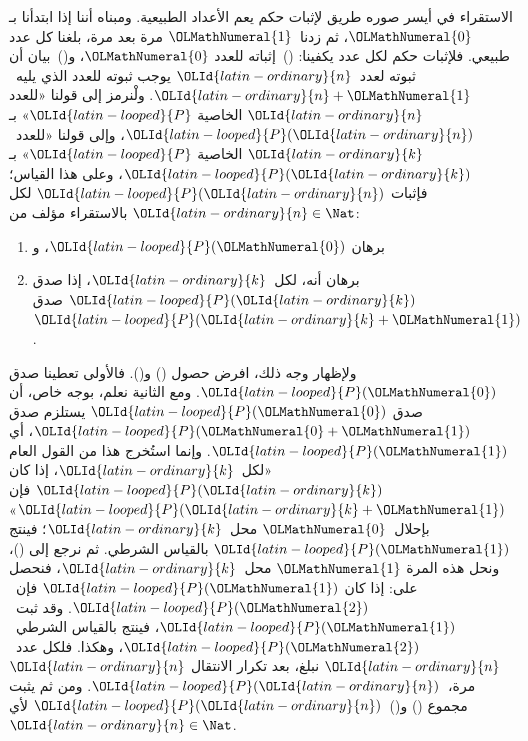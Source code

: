 \documentclass[../../../include/open-logic-section]{subfiles}
\begin{document}


الاستقراء في أيسر صوره طريق لإثبات حكم يعم الأعداد الطبيعية. ومبناه
أننا إذا ابتدأنا بـ${\OLMathNumeral{0}}$، ثم زدنا~${\OLMathNumeral{1}}$ مرة بعد مرة، بلغنا كل عدد طبيعي.
فلإثبات حكم لكل عدد يكفينا: ()~إثباته للعدد ${\OLMathNumeral{0}}$، و()~بيان أن ثبوته
لعدد~${\OLId{latin-ordinary}{n}}$ يوجب ثبوته للعدد الذي يليه~${\OLId{latin-ordinary}{n}}+{\OLMathNumeral{1}}$. ولْنرمز إلى قولنا «للعدد
${\OLId{latin-ordinary}{n}}$ الخاصية ${\OLId{latin-looped}{P}}$» بـ${\OLId{latin-looped}{P}}({\OLId{latin-ordinary}{n}})$، وإلى قولنا «للعدد~${\OLId{latin-ordinary}{k}}$ الخاصية ${\OLId{latin-looped}{P}}$»
بـ${\OLId{latin-looped}{P}}({\OLId{latin-ordinary}{k}})$، وعلى هذا القياس؛ فإثبات ${\OLId{latin-looped}{P}}({\OLId{latin-ordinary}{n}})$ لكل ${\OLId{latin-ordinary}{n}} \in \Nat$
بالاستقراء مؤلف من:
\begin{enumerate}
\item برهان ${\OLId{latin-looped}{P}}({\OLMathNumeral{0}})$، و
\item برهان أنه، لكل~${\OLId{latin-ordinary}{k}}$، إذا صدق ${\OLId{latin-looped}{P}}({\OLId{latin-ordinary}{k}})$ صدق ${\OLId{latin-looped}{P}}({\OLId{latin-ordinary}{k}}+{\OLMathNumeral{1}})$.
\end{enumerate}
ولإظهار وجه ذلك، افرض حصول () و(). فالأولى تعطينا صدق ${\OLId{latin-looped}{P}}({\OLMathNumeral{0}})$.
ومع الثانية نعلم، بوجه خاص، أن صدق ${\OLId{latin-looped}{P}}({\OLMathNumeral{0}})$ يستلزم صدق ${\OLId{latin-looped}{P}}({\OLMathNumeral{0}}+{\OLMathNumeral{1}})$، أي
${\OLId{latin-looped}{P}}({\OLMathNumeral{1}})$. وإنما استُخرج هذا من القول العام «لكل~${\OLId{latin-ordinary}{k}}$، إذا كان ${\OLId{latin-looped}{P}}({\OLId{latin-ordinary}{k}})$
فإن ${\OLId{latin-looped}{P}}({\OLId{latin-ordinary}{k}}+{\OLMathNumeral{1}})$» بإحلال~${\OLMathNumeral{0}}$ محل~${\OLId{latin-ordinary}{k}}$؛ فينتج ${\OLId{latin-looped}{P}}({\OLMathNumeral{1}})$ بالقياس الشرطي. ثم
نرجع إلى ()، ونحل هذه المرة ${\OLMathNumeral{1}}$ محل~${\OLId{latin-ordinary}{k}}$، فنحصل على: إذا كان
${\OLId{latin-looped}{P}}({\OLMathNumeral{1}})$ فإن~${\OLId{latin-looped}{P}}({\OLMathNumeral{2}})$. وقد ثبت~${\OLId{latin-looped}{P}}({\OLMathNumeral{1}})$، فينتج بالقياس الشرطي~${\OLId{latin-looped}{P}}({\OLMathNumeral{2}})$،
وهكذا. فلكل عدد~${\OLId{latin-ordinary}{n}}$ نبلغ، بعد تكرار الانتقال ${\OLId{latin-ordinary}{n}}$ مرة،~${\OLId{latin-looped}{P}}({\OLId{latin-ordinary}{n}})$. ومن ثم
يثبت مجموع () و()~${\OLId{latin-looped}{P}}({\OLId{latin-ordinary}{n}})$ لأي ${\OLId{latin-ordinary}{n}} \in \Nat$.
\end{document}

